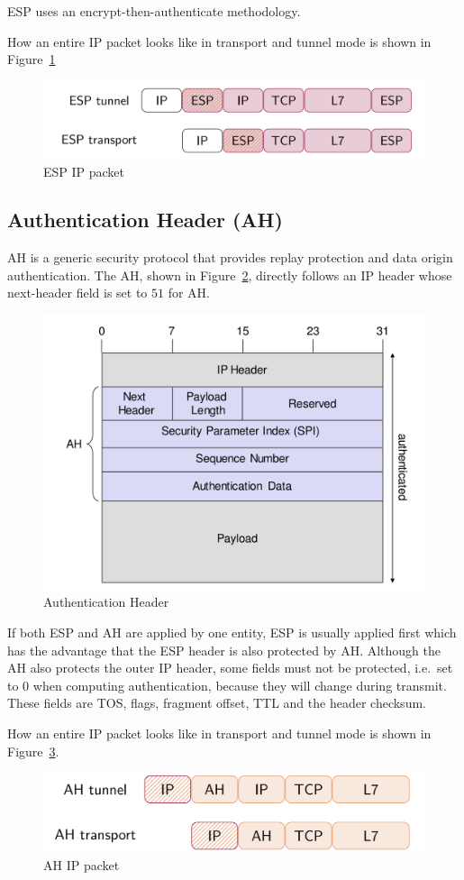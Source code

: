 ESP uses an encrypt-then-authenticate methodology.

How an entire IP packet looks like in transport and tunnel mode is shown in Figure~\ref{fig:esp_ip_packet}
\begin{figure}[h]
  \centering
  \includegraphics[width=.9\textwidth]{figures/esp_ip_packet}
  \caption{ESP IP packet}\label{fig:esp_ip_packet}
\end{figure}

\subsection{Authentication Header (AH)}
AH is a generic security protocol that provides replay protection and data origin authentication.
The AH, shown in Figure~\ref{fig:ah_header}, directly follows an IP header whose next-header field is set to $51$ for AH\@.
\begin{figure}[h]
  \centering
  \includegraphics[width=.7\textwidth]{figures/ah_header.png}
  \caption{Authentication Header}\label{fig:ah_header}
\end{figure}
If both ESP and AH are applied by one entity, ESP is usually applied first which has the advantage that the ESP header is also protected by AH\@.
Although the AH also protects the outer IP header, some fields must not be protected, i.e.\ set to $0$ when computing authentication, because they will change during transmit.
These fields are TOS, flags, fragment offset, TTL and the header checksum.

How an entire IP packet looks like in transport and tunnel mode is shown in Figure~\ref{fig:ah_ip_packet}.
\begin{figure}[h]
  \centering
  \includegraphics[width=.8\textwidth]{figures/ah_ip_packet.png}
  \caption{AH IP packet}\label{fig:ah_ip_packet}
\end{figure}

